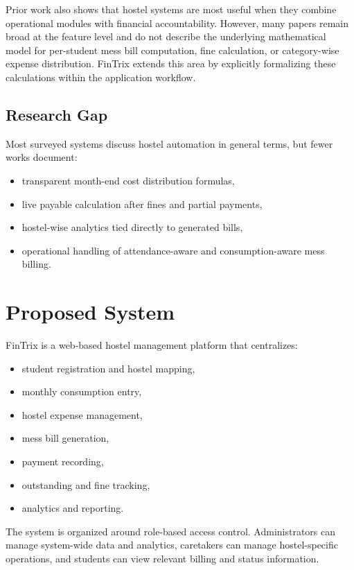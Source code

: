 \documentclass[conference]{IEEEtran}
\begin{document}
Prior work also shows that hostel systems are most useful when they combine operational modules with financial accountability. However, many papers remain broad at the feature level and do not describe the underlying mathematical model for per-student mess bill computation, fine calculation, or category-wise expense distribution. FinTrix extends this area by explicitly formalizing these calculations within the application workflow.

\subsection{Research Gap}
Most surveyed systems discuss hostel automation in general terms, but fewer works document:
\begin{itemize}
\item transparent month-end cost distribution formulas,
\item live payable calculation after fines and partial payments,
\item hostel-wise analytics tied directly to generated bills,
\item operational handling of attendance-aware and consumption-aware mess billing.
\end{itemize}

\section{Proposed System}
FinTrix is a web-based hostel management platform that centralizes:
\begin{itemize}
\item student registration and hostel mapping,
\item monthly consumption entry,
\item hostel expense management,
\item mess bill generation,
\item payment recording,
\item outstanding and fine tracking,
\item analytics and reporting.
\end{itemize}

The system is organized around role-based access control. Administrators can manage system-wide data and analytics, caretakers can manage hostel-specific operations, and students can view relevant billing and status information.
\end{document}
